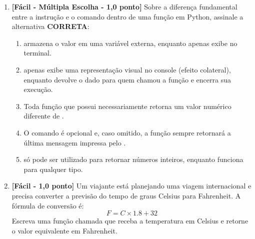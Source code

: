 \begin{enumerate}[label=\textbf{Q\arabic*.}, start=1]
\begin{enumerate}[label=\textbf{(\Alph*)}]
    \item {} (int),  (float),  (bool),  (bool)
    \item {} (int),  (float),  (bool),  (bool)
    \item {} (int),  (float),  (bool),  (bool)
    \item {} (float),  (float),  (bool),  (bool)
    \item {} (int),  (int),  (bool),  (bool)
\end{enumerate}



\vspace{0.4cm}

\item \textbf{[Fácil - Múltipla Escolha - 1,0 ponto]} Sobre a diferença fundamental entre a instrução  e o comando  dentro de uma função em Python, assinale a alternativa \textbf{CORRETA}:

\begin{enumerate}[label=\textbf{(\Alph*)}]
    \item {} armazena o valor em uma variável externa, enquanto  apenas exibe no terminal.
    \item {} apenas exibe uma representação visual no console (efeito colateral), enquanto  devolve o dado para quem chamou a função e encerra sua execução.
    \item Toda função que possui  necessariamente retorna um valor numérico diferente de .
    \item O comando  é opcional e, caso omitido, a função sempre retornará a última mensagem impressa pelo .
    \item {} só pode ser utilizado para retornar números inteiros, enquanto  funciona para qualquer tipo.
\end{enumerate}



\vspace{0.4cm}

\item \textbf{[Fácil - 1,0 ponto]} Um viajante está planejando uma viagem internacional e precisa converter a previsão do tempo de graus Celsius para Fahrenheit. A fórmula de conversão é:
\[
F = C \times 1.8 + 32
\]
Escreva uma função chamada  que receba a temperatura em Celsius e retorne o valor equivalente em Fahrenheit.


\end{enumerate}
